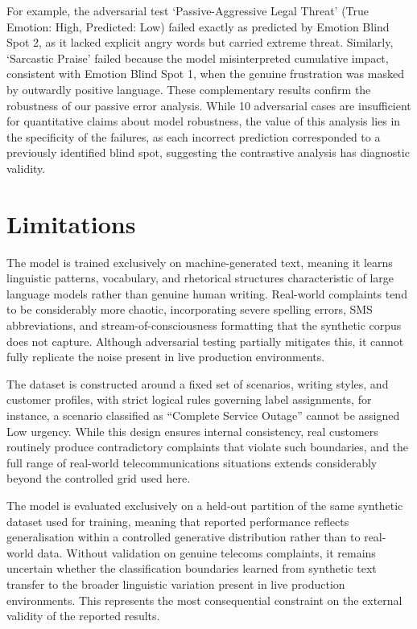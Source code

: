 \documentclass[11pt]{article}
\begin{document}
For example, the adversarial test `Passive-Aggressive Legal Threat' (True Emotion:
High, Predicted: Low) failed exactly as predicted by Emotion Blind Spot 2, as it lacked
explicit angry words but carried extreme threat. Similarly, `Sarcastic Praise' failed
because the model misinterpreted cumulative impact, consistent with Emotion Blind
Spot 1, when the genuine frustration was masked by outwardly positive language.
These complementary results confirm the robustness of our passive error analysis. While
10 adversarial cases are insufficient for quantitative claims about model robustness,
the value of this analysis lies in the specificity of the failures, as each incorrect
prediction corresponded to a previously identified blind spot, suggesting the
contrastive analysis has diagnostic validity.

\section{Limitations}

The model is trained exclusively on machine-generated text, meaning it learns linguistic
patterns, vocabulary, and rhetorical structures characteristic of large language models
rather than genuine human writing. Real-world complaints tend to be considerably more
chaotic, incorporating severe spelling errors, SMS abbreviations, and
stream-of-consciousness formatting that the synthetic corpus does not capture. Although
adversarial testing partially mitigates this, it cannot fully replicate the noise
present in live production environments.

The dataset is constructed around a fixed set of scenarios, writing styles, and customer
profiles, with strict logical rules governing label assignments, for instance, a scenario
classified as ``Complete Service Outage'' cannot be assigned Low urgency. While this
design ensures internal consistency, real customers routinely produce contradictory
complaints that violate such boundaries, and the full range of real-world
telecommunications situations extends considerably beyond the controlled grid used here.

The model is evaluated exclusively on a held-out partition of the same synthetic dataset
used for training, meaning that reported performance reflects generalisation within a
controlled generative distribution rather than to real-world data. Without validation on
genuine telecoms complaints, it remains uncertain whether the classification boundaries
learned from synthetic text transfer to the broader linguistic variation present in live
production environments. This represents the most consequential constraint on the
external validity of the reported results.
\end{document}

